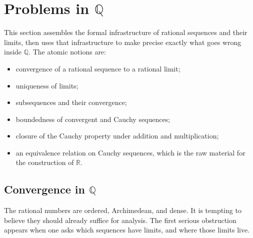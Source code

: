 
\section{Problems in $\mathbb{Q}$}
\label{sec:problems-in-q}

\begin{tcolorbox}[
  colback=gray!6,
  colframe=gray!40,
  arc=2pt,
  left=8pt, right=8pt, top=6pt, bottom=6pt,
  title={\small\textbf{Toolkit: Problems in $\mathbb{Q}$}},
  fonttitle=\small\bfseries
]
This section assembles the formal infrastructure of rational sequences and
their limits, then uses that infrastructure to make precise exactly what goes
wrong inside $\mathbb{Q}$.  The atomic notions are:
\begin{itemize}
  \item convergence of a rational sequence to a rational limit;
  \item uniqueness of limits;
  \item subsequences and their convergence;
  \item boundedness of convergent and Cauchy sequences;
  \item closure of the Cauchy property under addition and multiplication;
  \item an equivalence relation on Cauchy sequences, which is the
        raw material for the construction of $\mathbb{R}$.
\end{itemize}
\end{tcolorbox}

\subsection{Convergence in $\mathbb{Q}$}
\label{subsec:convergence-q}

\begin{remark}
The rational numbers are ordered, Archimedean, and dense.  It is tempting
to believe they should already suffice for analysis.  The first serious
obstruction appears when one asks which sequences have limits, and where
those limits live.
\end{remark}

